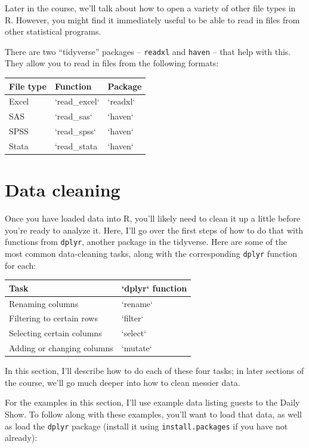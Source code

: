 \documentclass[]{book}
\begin{document}
Later in the course, we'll talk about how to open a variety of other
file types in R. However, you might find it immediately useful to be
able to read in files from other statistical programs.

There are two ``tidyverse'' packages -- \texttt{readxl} and
\texttt{haven} -- that help with this. They allow you to read in files
from the following formats:

\begin{tabular}{l|l|l}
\hline
File type & Function & Package\\
\hline
Excel & `read\_excel` & `readxl`\\
\hline
SAS & `read\_sas` & `haven`\\
\hline
SPSS & `read\_spss` & `haven`\\
\hline
Stata & `read\_stata & `haven`\\
\hline
\end{tabular}

\section{Data cleaning}\label{data-cleaning}

Once you have loaded data into R, you'll likely need to clean it up a
little before you're ready to analyze it. Here, I'll go over the first
steps of how to do that with functions from \texttt{dplyr}, another
package in the tidyverse. Here are some of the most common data-cleaning
tasks, along with the corresponding \texttt{dplyr} function for each:

\begin{tabular}{l|l}
\hline
Task & `dplyr` function\\
\hline
Renaming columns & `rename`\\
\hline
Filtering to certain rows & `filter`\\
\hline
Selecting certain columns & `select`\\
\hline
Adding or changing columns & `mutate`\\
\hline
\end{tabular}

In this section, I'll describe how to do each of these four tasks; in
later sections of the course, we'll go much deeper into how to clean
messier data.

For the examples in this section, I'll use example data listing guests
to the Daily Show. To follow along with these examples, you'll want to
load that data, as well as load the \texttt{dplyr} package (install it
using \texttt{install.packages} if you have not already):
\end{document}
